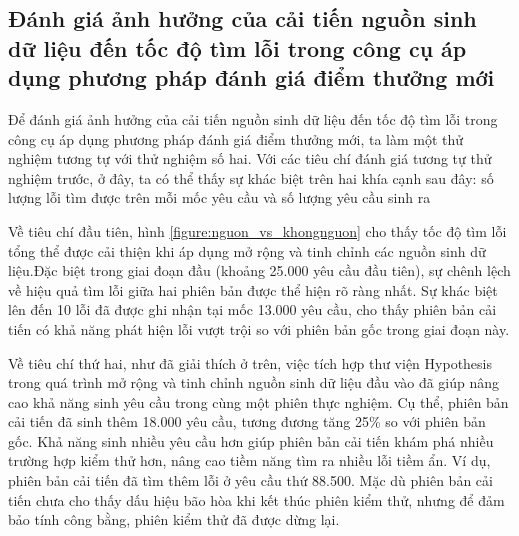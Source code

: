 \subsection{Đánh giá ảnh hưởng của cải tiến nguồn sinh dữ liệu đến tốc độ tìm lỗi trong công cụ áp dụng phương pháp đánh giá điểm thưởng mới}



Để đánh giá ảnh hưởng của cải tiến nguồn sinh dữ liệu đến tốc độ tìm lỗi trong công cụ áp dụng phương pháp đánh giá điểm thưởng mới, ta làm một thử nghiệm tương tự với thử nghiệm số hai. Với các tiêu chí đánh giá tương tự thử nghiệm trước, ở đây, ta có thể thấy sự khác biệt trên hai khía cạnh sau đây: số lượng lỗi tìm được trên mỗi mốc yêu cầu và số lượng yêu cầu sinh ra

Về tiêu chí đầu tiên, hình \ref{figure:nguon_vs_khongnguon} cho thấy tốc độ tìm lỗi tổng thể được cải thiện khi áp dụng mở rộng và tinh chỉnh các nguồn sinh dữ liệu.Đặc biệt trong giai đoạn đầu (khoảng 25.000 yêu cầu đầu tiên), sự chênh lệch về hiệu quả tìm lỗi giữa hai phiên bản được thể hiện rõ ràng nhất. Sự khác biệt lên đến 10 lỗi đã được ghi nhận tại mốc 13.000 yêu cầu, cho thấy phiên bản cải tiến có khả năng phát hiện lỗi vượt trội so với phiên bản gốc trong giai đoạn này.

Về tiêu chí thứ hai, như đã giải thích ở trên, việc tích hợp thư viện Hypothesis trong quá trình mở rộng và tinh chỉnh nguồn sinh dữ liệu đầu vào đã giúp nâng cao khả năng sinh yêu cầu trong cùng một phiên thực nghiệm. Cụ thể, phiên bản cải tiến đã sinh thêm 18.000 yêu cầu, tương đương tăng 25\% so với phiên bản gốc. Khả năng sinh nhiều yêu cầu hơn giúp phiên bản cải tiến khám phá nhiều trường hợp kiểm thử hơn, nâng cao tiềm năng tìm ra nhiều lỗi tiềm ẩn. Ví dụ, phiên bản cải tiến đã tìm thêm lỗi ở yêu cầu thứ 88.500. Mặc dù phiên bản cải tiến chưa cho thấy dấu hiệu bão hòa khi kết thúc phiên kiểm thử, nhưng để đảm bảo tính công bằng, phiên kiểm thử đã được dừng lại.

